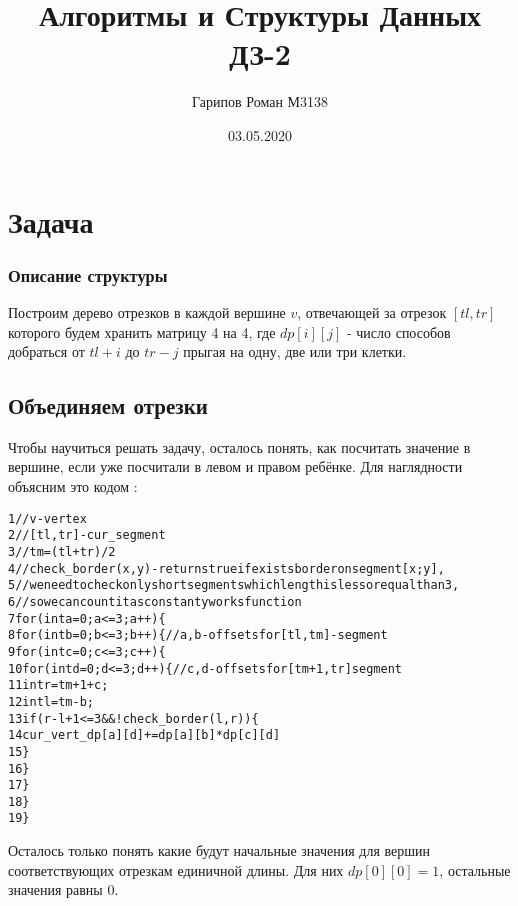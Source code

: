 \documentclass{article}
\title{Алгоритмы и Структуры Данных ДЗ-2}
\date{03.05.2020}
\author{Гарипов Роман М3138}
\begin{document}
  \maketitle

\section*{Задача }
\subsubsection*{Описание структуры}
Построим дерево отрезков в каждой вершине $v$, отвечающей за отрезок $[tl, tr]$ которого будем хранить матрицу 4 на 4, где $dp[i][j]$ - число способов добраться от $tl + i$ до  $tr - j$ прыгая на одну, две или три клетки. 
\subsection*{Объединяем отрезки}
Чтобы научиться решать задачу, осталось понять, как посчитать значение в вершине, если уже посчитали в левом и правом ребёнке. Для наглядности объясним это кодом :
\begin{alltt}
 1	 // v - vertex
 2	 // [tl, tr] - cur_segment
 3	 // tm = (tl + tr) / 2
 4	 // check_border(x, y) - returns true if exists border on segment [x;y], 
 5 	// we need to check only short segments which length is less or equal than 3,
 6 	// so we can count it as constanty works function
 7    for (int a = 0; a <= 3; a++) \{
 8       for (int b = 0; b <= 3; b++) \{  // a, b - offsets for [tl, tm] - segment
 9           for (int c = 0; c <= 3; c++) \{
10             for (int d = 0; d <= 3; d++) \{  // c, d - offsets for [tm + 1, tr] segment
11                int r = tm + 1 + c;
12                int l = tm - b;
13                if (r - l + 1 <= 3 && !check_border(l, r)) \{
14                   cur_vert_dp[a][d] += dp[a][b] * dp[c][d]
15                \}
16             \}
17          \}
18       \}
19    \}
\end{alltt}
Осталось только понять какие будут начальные значения для вершин соответствующих отрезкам единичной длины. Для них $dp[0][0] = 1$, остальные значения равны 0.
\end{document}
